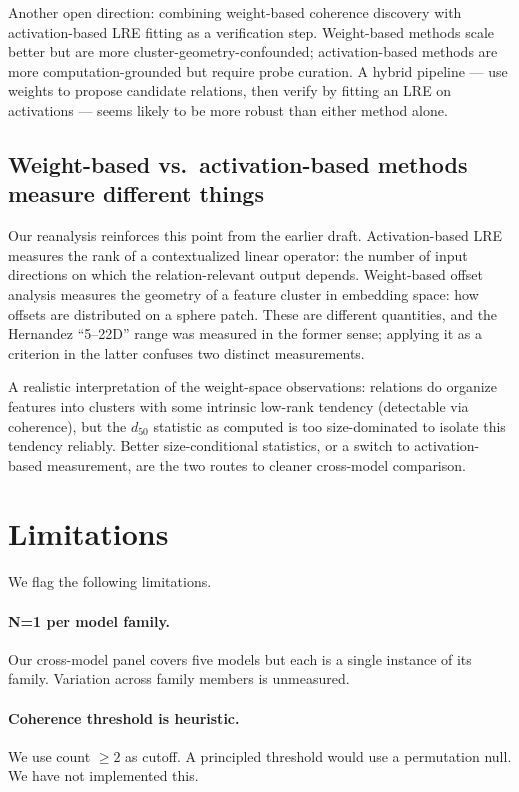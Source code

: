 \documentclass[11pt,letterpaper]{article}
\begin{document}
Another open direction: combining weight-based coherence discovery with activation-based LRE fitting as a verification step. Weight-based methods scale better but are more cluster-geometry-confounded; activation-based methods are more computation-grounded but require probe curation. A hybrid pipeline --- use weights to propose candidate relations, then verify by fitting an LRE on activations --- seems likely to be more robust than either method alone.

\subsection{Weight-based vs.\ activation-based methods measure different things}

Our reanalysis reinforces this point from the earlier draft. Activation-based LRE measures the rank of a contextualized linear operator: the number of input directions on which the relation-relevant output depends. Weight-based offset analysis measures the geometry of a feature cluster in embedding space: how offsets are distributed on a sphere patch. These are different quantities, and the Hernandez ``5--22D'' range was measured in the former sense; applying it as a criterion in the latter confuses two distinct measurements.

A realistic interpretation of the weight-space observations: relations do organize features into clusters with some intrinsic low-rank tendency (detectable via coherence), but the $d_{50}$ statistic as computed is too size-dominated to isolate this tendency reliably. Better size-conditional statistics, or a switch to activation-based measurement, are the two routes to cleaner cross-model comparison.

\section{Limitations}
\label{sec:limitations}

We flag the following limitations.

\paragraph{N=1 per model family.} Our cross-model panel covers five models but each is a single instance of its family. Variation across family members is unmeasured.

\paragraph{Coherence threshold is heuristic.} We use count $\geq 2$ as cutoff. A principled threshold would use a permutation null. We have not implemented this.
\end{document}
